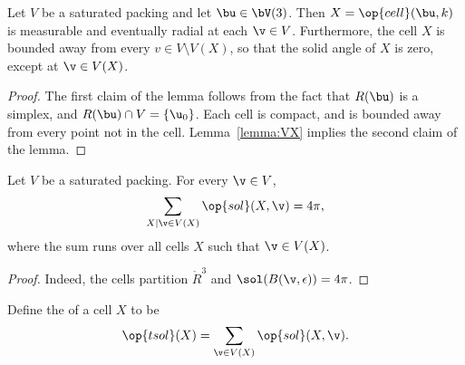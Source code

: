 \begin{lemma}\label{lemma:cell-radial}
  Let $V$ be a saturated packing and let $\bu\in \bV(3)$.  Then
  $X=\op{cell}(\bu,k)$ is measurable and eventually radial at each
  $\v\in V$.  Furthermore, the cell $X$ is bounded away from every
  $v\in V\setminus V(X)$, so that the solid angle of $X$ is zero, except
  at $\v\in V(X)$.
\end{lemma}

\begin{proof} The first claim of the
 lemma follows from the fact that $R(\bu)$ is a
  simplex, and $R(\bu)\cap V = \{\u_0\}$.
Each cell is compact, and is bounded away from every point not in
the cell. Lemma~\ref{lemma:VX} implies the second claim of the lemma.
\end{proof}



\begin{lemma}
Let $V$ be a saturated packing.  For every $\v\in V$, 
\[
\sum_{X\mid \v\in V(X)}  \op{sol}(X,\v) = 4\pi,
\]
where the sum runs over all cells $X$ such that $\v\in V(X)$.
\end{lemma}

\begin{proof} Indeed, the cells partition $\ring{R}^3$ and
  $\sol(B(\v,\epsilon)) = 4\pi$.
\end{proof}

\begin{definition}[$\op{tsol}$] 
  Define
  the  of a cell $X$ to be
\[  
\op{tsol}(X) = \sum_{\v \in V(X) } \op{sol}(X,\v).
\] 
\end{definition}
%
%
%


